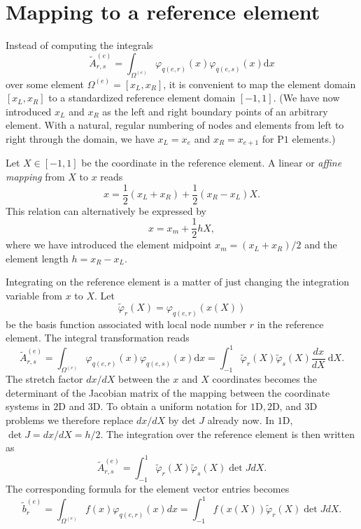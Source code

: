 \documentclass[../main.tex]{subfiles}
\begin{document}
\section[Mapping to a reference element]{Mapping to a reference element}
\label{sec:sec_3_8}
Instead of computing the integrals
$$
\tilde{A}_{r, s}^{(e)}=\int_{\Omega^{(e)}} \varphi_{q(e, r)}(x) \varphi_{q(e, s)}(x) \mathrm{d} x
$$
over some element $\Omega^{(e)}=\left[x_{L}, x_{R}\right]$, it is convenient to map the element domain $\left[x_{L}, x_{R}\right]$ to a standardized reference element domain $[-1,1]$. (We have now introduced $x_{L}$ and $x_{R}$ as the left and right boundary points of an arbitrary element. With a natural, regular numbering of nodes and elements from left to right through the domain, we have $x_{L}=x_{e}$ and $x_{R}=x_{e+1}$ for $\mathrm{P} 1$ elements.)

Let $X \in[-1,1]$ be the coordinate in the reference element. A linear or \textit{affine mapping} from $X$ to $x$ reads
\begin{equation}\label{eqa61}
	x=\frac{1}{2}\left(x_{L}+x_{R}\right)+\frac{1}{2}\left(x_{R}-x_{L}\right) X.
\end{equation}
This relation can alternatively be expressed by
\begin{equation}\label{eqa62}
	x=x_{m}+\frac{1}{2} h X,
\end{equation}
where we have introduced the element midpoint $x_{m}=\left(x_{L}+x_{R}\right) / 2$ and the element length $h=x_{R}-x_{L}$.

Integrating on the reference element is a matter of just changing the integration variable from $x$ to $X$. Let
\begin{equation}\label{eqa63}
	\tilde{\varphi}_{r}(X)=\varphi_{q(e, r)}(x(X))
\end{equation}
be the basis function associated with local node number $r$ in the reference element. The integral transformation reads
\begin{equation}\label{eqa64}
	\tilde{A}_{r, s}^{(e)}=\int_{\Omega^{(e)}} \varphi_{q(e, r)}(x) \varphi_{q(e, s)}(x) \mathrm{d} x=\int_{-1}^{1} \tilde{\varphi}_{r}(X) \tilde{\varphi}_{s}(X) \frac{d x}{d X} \mathrm{~d} X.
\end{equation}
The stretch factor $d x / d X$ between the $x$ and $X$ coordinates becomes the determinant of the Jacobian matrix of the mapping between the coordinate systems in $2 \mathrm{D}$ and 3D. To obtain a uniform notation for $1 \mathrm{D}, 2 \mathrm{D}$, and 3D problems we therefore replace $d x / d X$ by det $J$ already now. In $1 \mathrm{D}$, $\operatorname{det} J=d x / d X=h / 2$. The integration over the reference element is then written as
\begin{equation}\label{eqa65}
	\tilde{A}_{r, s}^{(e)}=\int_{-1}^{1} \tilde{\varphi}_{r}(X) \tilde{\varphi}_{s}(X) \operatorname{det} J d X.
\end{equation}
The corresponding formula for the element vector entries becomes
\begin{equation}\label{eqa66}
	\tilde{b}_{r}^{(e)}=\int_{\Omega^{(e)}} f(x) \varphi_{q(e, r)}(x) d x=\int_{-1}^{1} f(x(X)) \tilde{\varphi}_{r}(X) \operatorname{det} J d X.
\end{equation}
\end{document}
